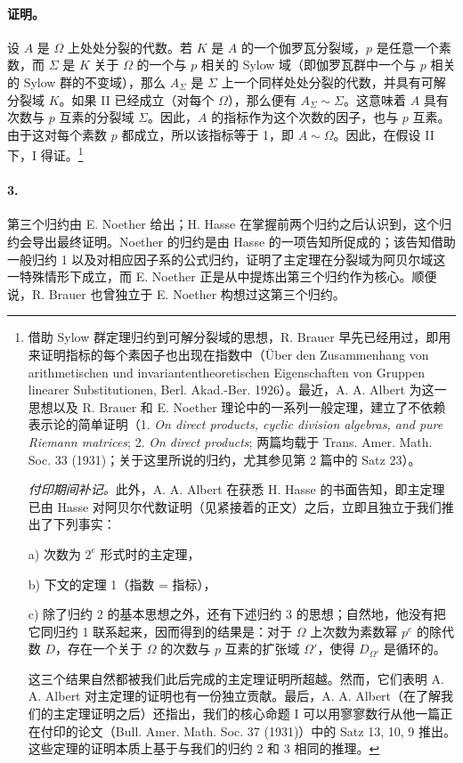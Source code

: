 \documentclass[11pt]{article}
\begin{document}
\paragraph{证明。}
设 \(A\) 是 \(\Omega\) 上处处分裂的代数。若 \(K\) 是 \(A\) 的一个伽罗瓦分裂域，\(p\) 是任意一个素数，而 \(\Sigma\) 是 \(K\) 关于 \(\Omega\) 的一个与 \(p\) 相关的 Sylow 域（即伽罗瓦群中一个与 \(p\) 相关的 Sylow 群的不变域），那么 \(A_{\Sigma}\) 是 \(\Sigma\) 上一个同样处处分裂的代数，并具有可解分裂域 \(K\)。如果 II 已经成立（对每个 \(\Omega\)），那么便有 \(A_{\Sigma}\sim \Sigma\)。这意味着 \(A\) 具有次数与 \(p\) 互素的分裂域 \(\Sigma\)。因此，\(A\) 的指标作为这个次数的因子，也与 \(p\) 互素。由于这对每个素数 \(p\) 都成立，所以该指标等于 1，即 \(A\sim\Omega\)。因此，在假设 II 下，I 得证。\footnote{借助 Sylow 群定理归约到可解分裂域的思想，R. Brauer 早先已经用过，即用来证明指标的每个素因子也出现在指数中（Über den Zusammenhang von arithmetischen und invariantentheoretischen Eigenschaften von Gruppen linearer Substitutionen, Berl. Akad.-Ber. 1926）。最近，A. A. Albert 为这一思想以及 R. Brauer 和 E. Noether 理论中的一系列一般定理，建立了不依赖表示论的简单证明（1. \emph{On direct products, cyclic division algebras, and pure Riemann matrices}; 2. \emph{On direct products}; 两篇均载于 Trans. Amer. Math. Soc. 33 (1931)；关于这里所说的归约，尤其参见第 2 篇中的 Satz 23）。

\emph{付印期间补记。}此外，A. A. Albert 在获悉 H. Hasse 的书面告知，即主定理已由 Hasse 对阿贝尔代数证明（见紧接着的正文）之后，立即且独立于我们推出了下列事实：

a) 次数为 \(2^e\) 形式时的主定理，

b) 下文的定理 1（指数 = 指标），

c) 除了归约 2 的基本思想之外，还有下述归约 3 的思想；自然地，他没有把它同归约 1 联系起来，因而得到的结果是：对于 \(\Omega\) 上次数为素数幂 \(p^e\) 的除代数 \(D\)，存在一个关于 \(\Omega\) 的次数与 \(p\) 互素的扩张域 \(\Omega'\)，使得 \(D_{\Omega'}\) 是循环的。

这三个结果自然都被我们此后完成的主定理证明所超越。然而，它们表明 A. A. Albert 对主定理的证明也有一份独立贡献。最后，A. A. Albert（在了解我们的主定理证明之后）还指出，我们的核心命题 I 可以用寥寥数行从他一篇正在付印的论文（Bull. Amer. Math. Soc. 37 (1931)）中的 Satz 13, 10, 9 推出。这些定理的证明本质上基于与我们的归约 2 和 3 相同的推理。}

\paragraph{3.}
第三个归约由 E. Noether 给出；H. Hasse 在掌握前两个归约之后认识到，这个归约会导出最终证明。Noether 的归约是由 Hasse 的一项告知所促成的；该告知借助一般归约 1 以及对相应因子系的公式归约，证明了主定理在分裂域为阿贝尔域这一特殊情形下成立，而 E. Noether 正是从中提炼出第三个归约作为核心。顺便说，R. Brauer 也曾独立于 E. Noether 构想过这第三个归约。
\end{document}
